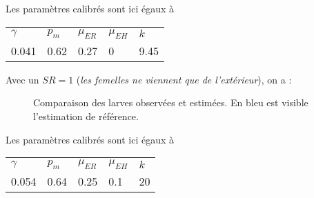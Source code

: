 \documentclass[a4paper, 11pt]{article}
\begin{document}
Les paramètres calibrés sont ici égaux à 

\begin{center}
\begin{tabular}{lllll}
$\gamma$ & $p_m$ & $\mu_{ER}$ & $\mu_{EH}$ & $k$\\
0.041 & 0.62 & 0.27 & 0 & 9.45
\end{tabular}
\end{center}

Avec un $SR = 1$ (\textit{les femelles ne viennent que de l'extérieur}), on a :

\begin{figure}[h]
 \centering
 \caption{Comparaison des larves observées et estimées. En bleu est visible l'estimation de référence.}
\end{figure}

Les paramètres calibrés sont ici égaux à 

\begin{center}
\begin{tabular}{lllll}
$\gamma$ & $p_m$ & $\mu_{ER}$ & $\mu_{EH}$ & $k$\\
0.054 & 0.64 & 0.25 & 0.1 & 20
\end{tabular}
\end{center}






















 
\end{document}
